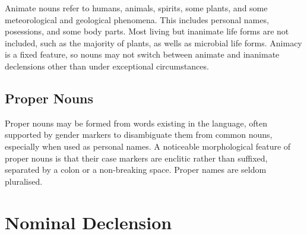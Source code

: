 \documentclass[grammar]{subfiles}
\begin{document}
	Animate nouns refer to humans, animals, spirits, some plants, and some meteorological and geological phenomena. This includes personal names, posessions, and some body parts. Most living but inanimate life forms are not included, such as the majority of plants, as wells as microbial life forms. Animacy is a fixed feature, so nouns may not switch between animate and inanimate declensions other than under exceptional circumstances.

	\subsection{Proper Nouns}
	\label{ssec:nm_proper_nouns}

	Proper nouns may be formed from words existing in the language\footnotemark{}, often supported by gender markers to disambiguate them from common nouns, especially when used as personal names. A noticeable morphological feature of proper nouns is that their case markers are enclitic rather than suffixed, separated by a colon or a non-breaking space. Proper names are seldom pluralised.






	\section{Nominal Declension}
	\label{sec:nm_declension}
\end{document}
